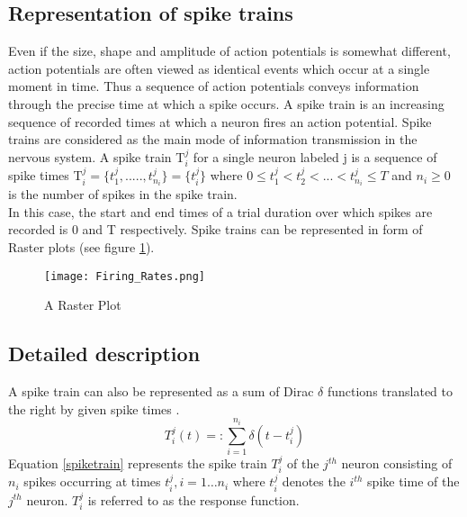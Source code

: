 \subsection{Representation of spike trains}
Even if the size, shape and amplitude of action potentials is somewhat different,
action potentials are often viewed as identical events which occur at a single moment in time. Thus a sequence of action potentials conveys information through the precise time at which  a spike occurs. A spike train is an increasing sequence of recorded times at which a neuron fires an action potential. Spike trains are considered as the main mode of information transmission in the nervous system.  A spike train T$_{i}^{j}$ for  a single neuron labeled j is a sequence of spike times T$_{i}^{j} = \{t_{1}^{j}, ....., t_{n_{i}}^{j} \} = \{t_{i}^{j}\}$ where $0 \leq t_{1}^{j} < t_{2}^{j}< ... < t_{n_{i}}^{j} \leq T$  and  $n_{i} \geq 0$ is the number of spikes in the spike train.\\
In this case, the start and end times of a trial duration over which spikes are recorded is 0 and T respectively. Spike trains can be represented in form of Raster plots (see figure \ref{fig:Raster}).\\
 
 \begin{figure}[H]
  \centering
    \texttt{[image: Firing\_Rates.png]}
     \caption{A Raster Plot}
      \label{fig:Raster}
\end{figure}


\subsection{Detailed description}
A spike train can also be represented as a sum of Dirac $\delta$ functions translated
to the right by given spike times \cite{Dayan2001}.
\begin{equation}\label{spiketrain}
 T_{i}^{j}(t) =: \sum_{i=1}^{n_{i}} \delta(t-t_{i}^{j})  
\end{equation}
Equation \eqref{spiketrain} represents the spike train $T_{i}^{j}$ of the $j^{th}$ neuron consisting of $n_{i}$ spikes occurring at times $t_{i}^{j}, i = 1 \ldots n_{i}$ where $t_{i}^{j}$ denotes the $i^{th}$ spike time of the $j^{th}$ neuron.  $T_{i}^{j}$ is referred to as the response function.\\

